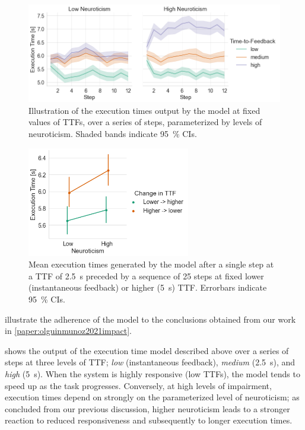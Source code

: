 \begin{figure}[tb]
    \centering
    \includegraphics[width=\textwidth]{Figs/2023EdgeDroid2/model_exectime_over_steps}
    \caption{
        Illustration of the execution times output by the model at fixed values of \glspl{TTF}, over a series of steps, parameterized by levels of neuroticism.
        Shaded bands indicate \SI{95}{\percent} \glspl{CI}.
    }\label{fig:model:exectimesoversteps}
\end{figure}

\begin{figure}
    \centering
    \includegraphics[height=13em]{Figs/2023EdgeDroid2/model_exectimes_transition}
    \caption{%
        Mean execution times generated by the model after a single step at a \gls{TTF} of \SI{2.5}{\second} preceded by a sequence of \num{25} steps at fixed lower (instantaneous feedback) or higher (\SI{5}{\second}) \gls{TTF}.
        Errorbars indicate \SI{95}{\percent} \glspl{CI}.
    }\label{fig:model:exectimestransitions}
\end{figure}


 illustrate the adherence of the model to the conclusions obtained from our work in \cref{paper:olguinmunoz2021impact}.

 shows the output of the execution time model described above over a series of steps at three levels of \gls{TTF};
\emph{low} (instantaneous feedback), \emph{medium} (\SI{2.5}{\second}), and \emph{high} (\SI{5}{\second}).
When the system is highly responsive (low \glspl{TTF}), the model tends to speed up as the task progresses.
Conversely, at high levels of impairment, execution times depend on strongly on the parameterized level of neuroticism;
as concluded from our previous discussion, higher neuroticism leads to a stronger reaction to reduced responsiveness and subsequently to longer execution times.

